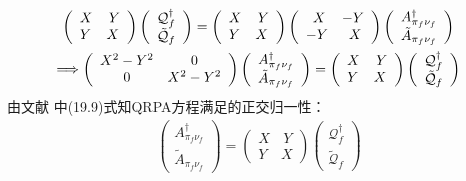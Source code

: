 \documentclass[master]{shnuthesis}
\begin{document}
\begin{gather}
    \left(\begin{array}{ll} X & \,Y  \\  Y & X \end{array}\right) \left(\begin{array}{l} \mathcal{Q}_f^\dagger \\ \tilde{\mathcal{Q}}_f \end{array}\right) = \left(\begin{array}{ll} X & \,Y  \\  Y & X \end{array}\right) \left(\begin{array}{ll} \,\,\,X & - Y  \\  - Y & \,\,\,X \end{array}\right) \left(\begin{array}{l} A_{\pi_f\nu_f}^\dagger \\ \tilde{A}_{\pi_f\nu_f} \end{array}\right) \notag\\
    \Longrightarrow \left(\begin{array}{ll} X^2-Y^2 & \,\,\,\,\,\,\,\,\,\,0  \\  \,\,\,\,\,\,\,\,\,\,0 & X^2-Y^2 \end{array}\right) \left(\begin{array}{l} A_{\pi_f\nu_f}^\dagger \\ \tilde{A}_{\pi_f\nu_f} \end{array}\right) = \left(\begin{array}{ll} X & \,Y  \\  Y & X \end{array}\right) \left(\begin{array}{l} \mathcal{Q}_f^\dagger \\ \tilde{\mathcal{Q}}_f \end{array}\right)
\end{gather}
由文献 \cite{Suhonen2013From} 中(19.9)式知QRPA方程满足的正交归一性：
\begin{align}
    \left(\begin{array}{l} A_{\pi_f\nu_f}^\dagger \\ \tilde{A}_{\pi_f\nu_f} \end{array}\right) = \left(\begin{array}{ll} X & \,Y  \\  Y & X \end{array}\right) \left(\begin{array}{l} \mathcal{Q}_f^\dagger \\ \tilde{\mathcal{Q}}_f \end{array}\right)
\end{align}
\end{document}
